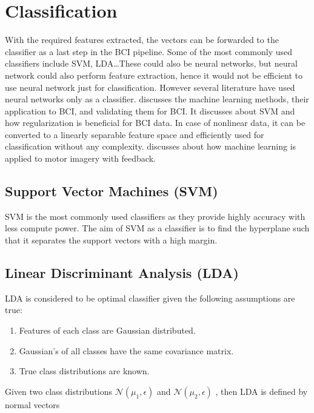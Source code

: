 \section{Classification} \label{clasff}
With the required features extracted, the vectors can be forwarded to the classifier as a last step in the BCI pipeline. Some of the most commonly used classifiers include SVM, LDA\dots These could also be neural networks, but neural network could also perform feature extraction, hence it would not be efficient to use neural network just for classification. However several literature have used neural networks only as a classifier.
\cite{2004_EEG_ML} discusses the machine learning methods, their application to BCI, and validating them for BCI. It discusses about SVM and how regularization is beneficial for BCI data. In case of nonlinear data, it can be converted to a linearly separable feature space and efficiently used for classification without any complexity. \cite{2006_EEG_ML_BrainState} discusses about how machine learning is applied to motor imagery with feedback.

\subsection{Support Vector Machines (SVM)}
SVM is the most commonly used classifiers as they provide highly accuracy with less compute power. The aim of SVM as a classifier is to find the hyperplane such that it separates the support vectors with a high margin. 

\subsection{Linear Discriminant Analysis (LDA)}
LDA  is considered to be optimal classifier given the following assumptions are true:
\begin{enumerate}
    \item Features of each class are Gaussian distributed.
    \item Gaussian's of all classes have the same covariance matrix.
    \item True class distributions are known.
\end{enumerate}



Given two class distributions $\mathcal{N} (\mu_1, \epsilon )$ and $\mathcal{N} (\mu_2, \epsilon  )$ , then LDA is defined by normal vectors

